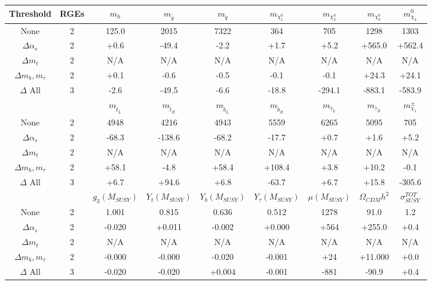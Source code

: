 \begin{table}
\begin{center}
\begin{tabular}{|c|c|ccccccc|}\hline
Threshold & RGEs  & $m_h$  & $m_{\tilde g}$ & $m_{{\tilde q}}$ & $m_{\chi_1^0}$  & $m_{\chi_2^0}$ & $m_{\chi_3^0}$ & $m_{\chi_4}^0$ \\ \hline
None               & 2 & 125.0 & 2015 & 7322 &  364 &  705 & 1298 &1303\\
$\Delta \alpha_s$  & 2 &  +0.6 & -49.4 &  -2.2 &  +1.7 &  +5.2 & +565.0 &+562.4\\
$\Delta m_t$      & 2 & N/A & N/A & N/A & N/A & N/A & N/A & N/A  \\
$\Delta m_b, m_\tau$& 2 &  +0.1 &  -0.6 &  -0.5 &  -0.1 &  -0.1 & +24.3 &+24.1\\
$\Delta$ All      & 3 &  -2.6 & -49.5 &  -6.6 & -18.8 & -294.1 & -883.1 &-583.9\\

%
\hline&& $m_{{\tilde t}_L}$  & $m_{{\tilde t}_R}$ &$m_{{\tilde b}_L}$&$m_{{\tilde b}_R}$&$m_{{\tilde \tau}_L}$&$m_{{\tilde \tau}_R}$&$m_{\chi_1}^\pm$ \\ \hline
None             & 2 &4948 & 4216 & 4943 & 5559 & 6265 & 5095 & 705\\
$\Delta \alpha_s$  & 2 & -68.3 & -138.6 & -68.2 & -17.7 &  +0.7 &  +1.6 & +5.2\\
$\Delta m_t$      & 2 & N/A & N/A & N/A & N/A & N/A & N/A & N/A \\
$\Delta m_b, m_\tau$& 2 & +58.1 &  -4.8 & +58.4 & +108.4 &  +3.8 & +10.2 & -0.1\\
$\Delta$ All      & 3 &  +6.7 & +94.6 &  +6.8 & -63.7 &  +6.7 & +15.8 &-305.6\\

%
\hline      &  & $g_3(M_{SUSY})$ & $Y_t(M_{SUSY})$ &  $Y_b(M_{SUSY})$ & $Y_\tau(M_{SUSY})$  & $\mu(M_{SUSY})$    & $\Omega_{CDM} h^2$ & $\sigma_{SUSY}^{TOT}$\\ \hline
 None                   & 2 & 1.001 & 0.815 & 0.636 & 0.512 & 1278 &  91.0 &   1.2\\
$\Delta \alpha_s$  & 2 & -0.020 & +0.011 & -0.002 & +0.000 & +564 & +255.0 &  +0.4\\
$\Delta m_t$      & 2 & N/A & N/A & N/A & N/A & N/A & N/A& N/A\\
$\Delta m_b, m_\tau$& 2 & -0.000 & -0.000 & -0.020 & -0.001 &  +24 & +11.000 &  +0.0\\
$\Delta$ All      & 3 & -0.020 & -0.020 & +0.004 & -0.001 & -881 & -90.9 & +0.4\\


\end{tabular}
\end{center}
\end{table}
